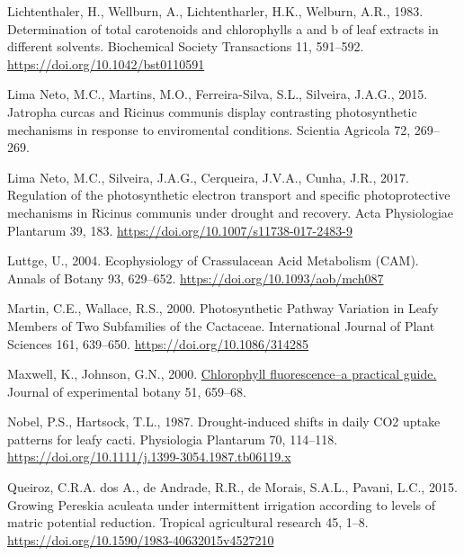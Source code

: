 \documentclass[
  12pt,
  letterpaper,
  DIV=11,
  numbers=noendperiod]{scrartcl}
\newlength{\cslhangindent}
\newlength{\cslentryspacingunit} %
\newenvironment{CSLReferences}[2] %
 {%
  \setlength{\parindent}{0pt}
  \ifodd #1
  \let\oldpar\par
  \def\par{\hangindent=\cslhangindent\oldpar}
  \fi
  \setlength{\parskip}{#2\cslentryspacingunit}
 }%
 {}
\begin{document}
\begin{CSLReferences}{1}{0}
\leavevmode{}%
Lichtenthaler, H., Wellburn, A., Lichtentharler, H.K., Welburn, A.R.,
1983. Determination of total carotenoids and chlorophylls a and b of
leaf extracts in different solvents. Biochemical Society Transactions
11, 591--592. \url{https://doi.org/10.1042/bst0110591}

\leavevmode{}%
Lima Neto, M.C., Martins, M.O., Ferreira-Silva, S.L., Silveira, J.A.G.,
2015. Jatropha curcas and {Ricinus} communis display contrasting
photosynthetic mechanisms in response to enviromental conditions.
Scientia Agricola 72, 269--269.

\leavevmode{}%
Lima Neto, M.C., Silveira, J.A.G., Cerqueira, J.V.A., Cunha, J.R., 2017.
Regulation of the photosynthetic electron transport and specific
photoprotective mechanisms in {Ricinus} communis under drought and
recovery. Acta Physiologiae Plantarum 39, 183.
\url{https://doi.org/10.1007/s11738-017-2483-9}

\leavevmode{}%
Luttge, U., 2004. Ecophysiology of {Crassulacean Acid Metabolism}
({CAM}). Annals of Botany 93, 629--652.
\url{https://doi.org/10.1093/aob/mch087}

\leavevmode{}%
Martin, C.E., Wallace, R.S., 2000. Photosynthetic {Pathway Variation} in
{Leafy Members} of {Two Subfamilies} of the {Cactaceae}. International
Journal of Plant Sciences 161, 639--650.
\url{https://doi.org/10.1086/314285}

\leavevmode{}%
Maxwell, K., Johnson, G.N., 2000.
\href{https://www.ncbi.nlm.nih.gov/pubmed/10938857}{Chlorophyll
fluorescence--a practical guide.} Journal of experimental botany 51,
659--68.

\leavevmode{}%
Nobel, P.S., Hartsock, T.L., 1987. Drought-induced shifts in daily {CO2}
uptake patterns for leafy cacti. Physiologia Plantarum 70, 114--118.
\url{https://doi.org/10.1111/j.1399-3054.1987.tb06119.x}

\leavevmode{}%
Queiroz, C.R.A. dos A., de Andrade, R.R., de Morais, S.A.L., Pavani,
L.C., 2015. Growing {Pereskia} aculeata under intermittent irrigation
according to levels of matric potential reduction. Tropical agricultural
research 45, 1--8. \url{https://doi.org/10.1590/1983-40632015v4527210}


\end{CSLReferences}
\end{document}
